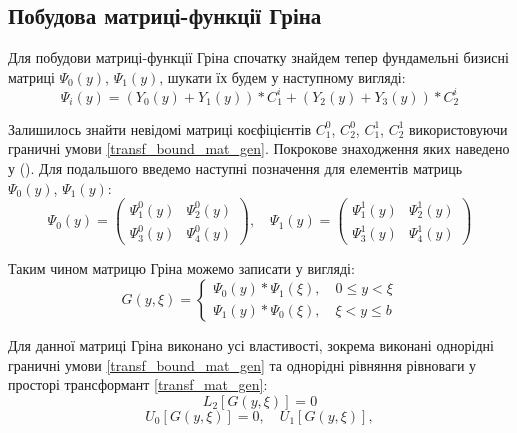 \subsection{Побудова матриці-функції Гріна}
Для побудови матриці-функції Гріна спочатку знайдем тепер фундамельні бизисні матриці $\Psi_0(y)$, $\Psi_1(y)$, шукати їх будем у наступному вигляді:
\begin{equation}\label{psi_gen}
    \Psi_i(y) = \left( Y_0(y) + Y_1(y) \right) * C_1^i + \left( Y_2(y) + Y_3(y) \right) * C_2^i
\end{equation}

Залишилось знайти невідомі матриці коєфіцієнтів $C_1^0$, $C_2^0$, $C_1^1$, $C_2^1$ використовуючи граничні умови \eqref{transf_bound_mat_gen}.
Покрокове знаходження яких наведено у ().
Для подальшого введемо наступні позначення для елементів матриць $\Psi_0(y)$, $\Psi_1(y)$:
\begin{equation*}
    \Psi_0(y) = \begin{pmatrix}
        \Psi_1^0(y) &  \Psi_2^0(y) \\
        \Psi_3^0(y) &  \Psi_4^0(y) 
    \end{pmatrix}, \quad 
    \Psi_1(y) = \begin{pmatrix}
        \Psi_1^1(y) &  \Psi_2^1(y) \\
        \Psi_3^1(y) &  \Psi_4^1(y) 
    \end{pmatrix}      
\end{equation*}

Таким чином матрицю Гріна можемо записати у вигляді:
\begin{equation}
    G(y,\xi) = 
    \begin{cases}
        \Psi_0(y) * \Psi_1(\xi), \quad 0 \le y < \xi \\
        \Psi_1(y) * \Psi_0(\xi), \quad \xi < y \le b
    \end{cases}
\end{equation}

Для данної матриці Гріна виконано усі властивості, зокрема виконані однорідні граничні умови \eqref{transf_bound_mat_gen}
та однорідні рівняння рівноваги у просторі трансформант \eqref{transf_mat_gen}:
\begin{equation*}
    L_2\left[  G(y, \xi) \right] = 0
\end{equation*}
\begin{equation*}
    U_0\left[ G(y, \xi) \right] = 0, \quad  U_1\left[ G(y, \xi) \right],
\end{equation*}


